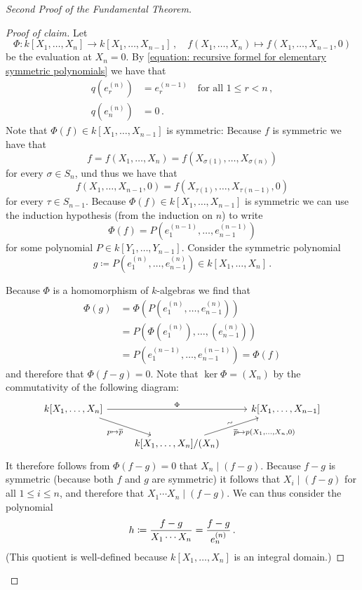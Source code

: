 \begin{proof}[Second Proof of the Fundamental Theorem]
\begin{proof}[Proof of claim]
    Let
    \[
              \Phi
      \colon  k[X_1, \dotsc, X_n]
      \to     k[X_1, \dotsc, X_{n-1}] \,,
      \quad   f(X_1, \dotsc, X_n)
      \mapsto f(X_1, \dotsc, X_{n-1}, 0)
    \]
    be the evaluation at $X_n = 0$.
    By \eqref{equation: recursive formel for elementary symmetric polynomials} we have that
    \begin{align*}
          q\left( e^{(n)}_r \right)
      &=  e^{(n-1)}_r
      \quad \text{for all $1 \leq r < n$} \,,
      \\
          q\left( e^{(n)}_n \right)
      &=  0 \,.
    \end{align*}
    Note that $\Phi(f) \in k[X_1, \dotsc, X_{n-1}]$ is symmetric:
    Because $f$ is symmetric we have that
    \[
        f
      = f(X_1, \dotsc, X_n)
      = f(X_{\sigma(1)}, \dotsc, X_{\sigma(n)})
    \]
    for every $\sigma \in S_n$, und thus we have that
    \[
        f(X_1, \dotsc, X_{n-1}, 0)
      = f(X_{\tau(1)}, \dotsc, X_{\tau(n-1)}, 0)
    \]
    for every $\tau \in S_{n-1}$.
    Because $\Phi(f) \in k[X_1, \dotsc, X_{n-1}]$ is symmetric we can use the induction hypothesis (from the induction on $n$) to write
    \[
        \Phi(f)
      = P\left( e^{(n-1)}_1, \dotsc, e^{(n-1)}_{n-1} \right)
    \]
    for some polynomial $P \in k[Y_1, \dotsc, Y_{n-1}]$.
    Consider the symmetric polynomial
    \[
                g
      \coloneqq P\left( e^{(n)}_1, \dotsc, e^{(n)}_{n-1} \right)
      \in       k[X_1, \dotsc, X_n] \,.
    \]
    
    Because $\Phi$ is a homomorphism of $k$-algebras we find that
    \begin{align*}
         \Phi(g)
      &= \Phi\left( P\left(e^{(n)}_1, \dotsc, e^{(n)}_{n-1}\right) \right) \\
      &= P\left( \Phi\left(e^{(n)}_1\right), \dotsc, \left(e^{(n)}_{n-1}\right) \right) \\
      &= P\left( e^{(n-1)}_1, \dotsc, e^{(n-1)}_{n-1} \right)
       = \Phi(f)
    \end{align*}
    and therefore that $\Phi(f - g) = 0$.
    Note that $\ker \Phi = (X_n)$ by the commutativity of the following diagram:
    \[
      \begin{tikzcd}
          k[X_1, \dotsc, X_n]
          \arrow{rr}[above]{\Phi}
          \arrow{rd}[below left]{p \mapsto \class{p}}
        & {}
        & k[X_1, \dotsc, X_{n-1}]
        \\
          {}
        & k[X_1, \dotsc, X_n]/(X_n)
          \arrow{ru}[above,rotate=20]{\sim}[below right]{\class{p} \mapsto p(X_1, \dotsc, X_n, 0)}
        & {}
      \end{tikzcd}
    \]
    It therefore follows from $\Phi(f - g) = 0$ that $X_n \mid (f-g)$.
    Because $f-g$ is symmetric (because both $f$ and $g$ are symmetric) it follows that $X_i \mid (f-g)$ for all $1 \leq i \leq n$, and therefore that $X_1 \dotsm X_n \mid (f-g)$.
    We can thus consider the polynomial
    \[
                h
      \coloneqq  \frac{f-g}{X_1 \dotsm X_n}
      =         \frac{f-g}{e^{(n)}_n} \,.
    \]
    (This quotient is well-defined because $k[X_1, \dotsc, X_n]$ is an integral domain.)
    

\end{proof}
\end{proof}
